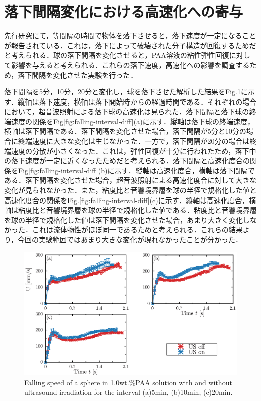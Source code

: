 \section{落下間隔変化における高速化への寄与}
先行研究\cite{ref:8-5}にて，等間隔の時間で物体を落下させると，落下速度が一定になることが報告されている．これは，落下によって破壊された分子構造が回復するためだと考えられる．球の落下間隔を変化させると，PAA溶液の粘性弾性回復に対して影響を与えると考えられる．これらの落下速度，高速化への影響を調査するため，落下間隔を変化させた実験を行った．

落下間隔を5分，10分，20分と変化し，球を落下させた解析した結果をFig.\ref{fig:falling-interval}に示す．縦軸は落下速度，横軸は落下開始時からの経過時間である．それぞれの場合において，超音波照射による落下球の高速化は見られた．落下間隔と落下球の終端速度の関係をFig\ref{fig:falling-interval-diff}(a)に示す．縦軸は落下球の終端速度，横軸は落下間隔である．落下間隔を変化させた場合，落下間隔が5分と10分の場合に終端速度に大きな変化は生じなかった．一方で，落下間隔が20分の場合は終端速度の分散が小さくなった．これは，弾性回復が十分に行われたため，落下中の落下速度が一定に近くなったためだと考えられる．落下間隔と高速化度合の関係をFig\ref{fig:falling-interval-diff}(b)に示す．縦軸は高速化度合，横軸は落下間隔である．落下間隔を変化させた場合，超音波照射による高速化度合に対して大きな変化が見られなかった．また，粘度比と音響境界層を球の半径で規格化した値と高速化度合の関係をFig.\ref{fig:falling-interval-diff}(c)に示す．縦軸は高速化度合，横軸は粘度比と音響境界層を球の半径で規格化した値である．粘度比と音響境界層を球の半径で規格化した値は落下間隔を変化させた場合，あまり大きく変化しなかった．これは流体物性がほぼ同一であるためと考えられる．これらの結果より，今回の実験範囲ではあまり大きな変化が現れなかったことが分かった．
\begin{figure}[H]
    \centering
    \includegraphics[width=1\textwidth]{./X-Appendix/interval/interval.eps}
    \caption{Falling speed of a sphere in 1.0wt.\%PAA solution with and without ultrasound irradiation for the interval (a)5min, (b)10min, (c)20min.}
    \label{fig:falling-interval}
\end{figure}

